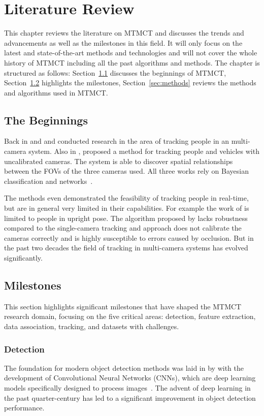 \chapter{Literature Review}\label{chap:literature_review}
This chapter reviews the literature on MTMCT and discusses the trends and advancements as well as the milestones in this field. It will only focus on the latest and state-of-the-art methods and technologies and will not cover the whole history of MTMCT including all the past algorithms and methods. The chapter is structured as follows: Section~\ref{sec:the_beginnings} discusses the beginnings of MTMCT, Section~\ref{sec:milestones} highlights the milestones, Section~\ref{sec:methods} reviews the methods and algorithms used in MTMCT.

\section{The Beginnings}\label{sec:the_beginnings}
Back in \citeyear{Cai99} and \citeyear{Chang01} \textcite{Cai99} and \textcite{Chang01} conducted research in the area of tracking people in an multi-camera system. Also in \citeyear{Khan01}, \textcite{Khan01} proposed a method for tracking people and vehicles with uncalibrated cameras. The system is able to discover spatial relationships between the FOVs of the three cameras used. All three works rely on Bayesian classification and networks~\cite{Pearl88}.

The methods even demonstrated the feasibility of tracking people in real-time, but are in general very limited in their capabilities. For example the work of \citeauthor{Chang01} is limited to people in upright pose. The algorithm proposed by \citeauthor{Cai99} lacks robustness compared to the single-camera tracking and \citeauthor{Khan01} approach does not calibrate the cameras correctly and is highly susceptible to errors caused by occlusion. But in the past two decades the field of tracking in multi-camera systems has evolved significantly.

\section{Milestones}\label{sec:milestones}
This section highlights significant milestones that have shaped the MTMCT research domain, focusing on the five critical areas: detection, feature extraction, data association, tracking, and datasets with challenges.

\subsection{Detection}\label{subsec:milestone_detection}
The foundation for modern object detection methods was laid in \citeyear{Lecun98} by \citeauthor{Lecun98} with the development of Convolutional Neural Networks (CNNs), which are deep learning models specifically designed to process images~\cite{Lecun98}. The advent of deep learning in the past quarter-century has led to a significant improvement in object detection performance.

